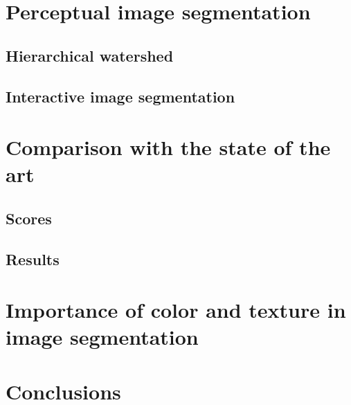 
\section{Perceptual image segmentation}
\subsection{Hierarchical watershed}
\subsection{Interactive image segmentation}



\section{Comparison with the state of the art}
\subsection{Scores}
\subsection{Results}


\section{Importance of color and texture in image segmentation}


\section{Conclusions}
